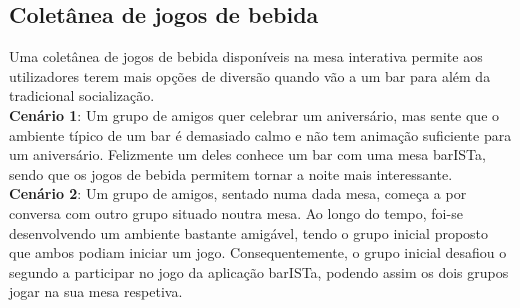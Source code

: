 \documentclass{article}
\begin{document}
\subsection*{Coletânea de jogos de bebida}
Uma coletânea de jogos de bebida disponíveis na mesa interativa permite aos utilizadores terem mais opções de diversão quando vão a um bar para além da tradicional socialização.\\
\textbf{Cenário 1}: Um grupo de amigos quer celebrar um aniversário, mas sente que o ambiente típico de um bar é demasiado calmo e não tem animação suficiente para um aniversário. Felizmente um deles conhece um bar com uma mesa barISTa, sendo que os jogos de bebida permitem tornar a noite mais interessante.\\
\textbf{Cenário 2}: Um grupo de amigos, sentado numa dada mesa, começa a por conversa com outro grupo situado noutra mesa. Ao longo do tempo, foi-se desenvolvendo um ambiente bastante amigável, tendo o grupo inicial proposto que ambos podiam iniciar um jogo. Consequentemente, o grupo inicial desafiou o segundo a participar no jogo da aplicação barISTa, podendo assim os dois grupos jogar na sua mesa respetiva.
\end{document}
